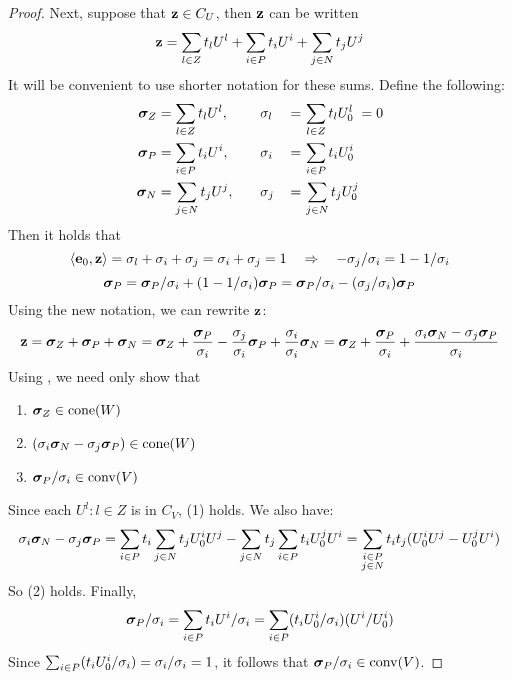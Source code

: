 \begin{proof}
	Next, suppose that $\mathbf{z} \in C_U$, then $\mathbf{z}$ can be written
	\[ \mathbf{z} = \sum_{l\in Z} t_l U^l + \sum_{i\in P} t_i U^i + \sum_{j\in N} t_j U^j \]
	It will be convenient to use shorter notation for these sums.  Define the following:
	\begin{alignat*}{3}
		\bm{\sigma}_Z & = \sum_{l\in Z} t_l U^l, \quad &  & \sigma_l \, & = & \, \sum_{l\in Z} t_l U^l_{0} \;= 0 \\
		\bm{\sigma}_P & = \sum_{i\in P} t_i U^i, \quad &  & \sigma_i \, & = & \, \sum_{i\in P} t_i U^i_{0}       \\
		\bm{\sigma}_N & = \sum_{j\in N} t_j U^j, \quad &  & \sigma_j \, & = & \, \sum_{j\in N} t_j U^j_{0}
	\end{alignat*}
	Then it holds that
	\[ \left\langle \mathbf{e}_0, \mathbf{z} \right\rangle = \sigma_l + \sigma_i + \sigma_j = \sigma_i + \sigma_j = 1
		\quad\Rightarrow\quad -\sigma_j/\sigma_i = 1 - 1/\sigma_i \]
	\[ \bm{\sigma}_P = \bm{\sigma}_P/\sigma_i + (1-1/\sigma_i)\bm{\sigma}_P
		= \bm{\sigma}_P/\sigma_i - (\sigma_j/\sigma_i)\bm{\sigma}_P \]
	Using the new notation, we can rewrite $\mathbf{z}$:
	\[ \mathbf{z} = \bm{\sigma}_Z + \bm{\sigma}_P + \bm{\sigma}_N
		= \bm{\sigma}_Z + \frac{\bm{\sigma}_P}{\sigma_i} - \frac{\sigma_j}{\sigma_i}\bm{\sigma}_P
		+ \frac{\sigma_i}{\sigma_i}\bm{\sigma}_N
		= \bm{\sigma}_Z + \frac{\bm{\sigma}_P}{\sigma_i} +
		\frac{\sigma_i\bm{\sigma}_N - \sigma_j\bm{\sigma}_P}{\sigma_i}
	\]
	Using , we need only show that
	\begin{enumerate}
		\item $\bm{\sigma}_Z \in \operatorname{cone}(W)$
		\item $(\sigma_i\bm{\sigma}_N - \sigma_j\bm{\sigma}_P) \in \operatorname{cone}(W)$
		\item $\bm{\sigma}_P/\sigma_i \in \operatorname{conv}(V)$
	\end{enumerate}
	Since each $U^l : l \in Z$ is in $C_V$, (1) holds.  We also have:
	\[ \sigma_i\bm{\sigma}_N - \sigma_j\bm{\sigma}_P =
		\sum_{i\in P} t_i \sum_{j\in N} t_j U^i_{0} U^j - \sum_{j\in N} t_j \sum_{i\in P} t_i U^j_{0} U^i =
		\sum_{\substack{i\in P \\ j\in N}} t_i t_j(U^i_{0} U^j - U^j_{0} U^i) \]
	So (2) holds.  Finally,
	\[ \bm{\sigma}_P/\sigma_i = \sum_{i\in P} t_i U^i / \sigma_i = \sum_{i\in P} (t_i U^i_{0}/\sigma_i)(U^i/U^i_{0}) \]
	Since $\sum_{i\in P} (t_i U^i_{0}/\sigma_i) = \sigma_i / \sigma_i = 1$, it follows that $\bm{\sigma}_P / \sigma_i \in \operatorname{conv}(V)$.
\end{proof}

